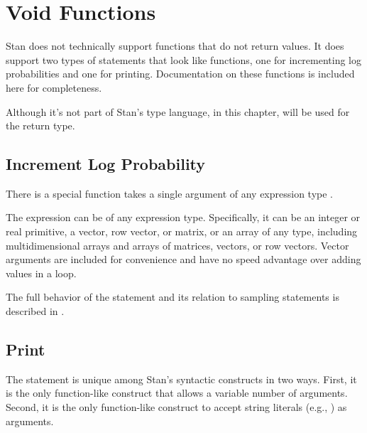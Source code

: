 \chapter{Void Functions}

Stan does not technically support functions that do not return values.
It does support two types of statements that look like functions, one
for incrementing log probabilities and one for printing.
Documentation on these functions is included here for completeness.

Although it's not part of Stan's type language, in this chapter,
 will be used for the return type.

\section{Increment Log Probability}

There is a special function  takes a single
argument of any expression type .
%
\begin{description}
\end{description}
%
The expression  can be of any expression type.  Specifically,
it can be an integer or real primitive, a vector, row vector, or
matrix, or an array of any type, including multidimensional arrays and
arrays of matrices, vectors, or row vectors.  Vector arguments are
included for convenience and have no speed advantage over adding
values in a loop.

The full behavior of the  statement and its
relation to sampling statements is described in
.


\section{Print}

The  statement is unique among Stan's syntactic constructs
in two ways.  First, it is the only function-like construct that
allows a variable number of arguments.  Second, it is the only
function-like construct to accept string literals (e.g., ) as arguments.

